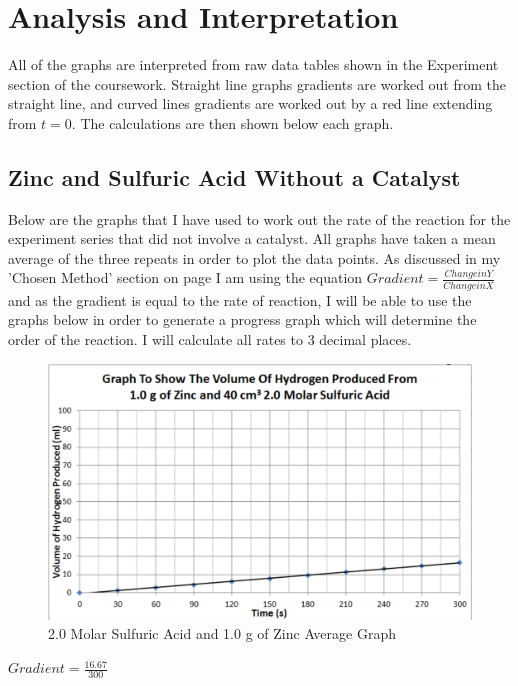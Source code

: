 \chapter {Analysis and Interpretation}

All of the graphs are interpreted from raw data tables shown in the Experiment section of the coursework. Straight line graphs gradients are worked out from the straight line, and curved lines gradients are worked out by a red line extending from $t = 0$. The calculations are then shown below each graph.

\section{Zinc and Sulfuric Acid Without a Catalyst}

Below are the graphs that I have used to work out the rate of the reaction for the experiment series that did not involve a catalyst. All graphs have taken a mean average of the three repeats in order to plot the data points. As discussed in my 'Chosen Method' section on page \pageref{Chosen Method} I am using the equation $Gradient = \frac{Change in Y}{Change in X}$ and as the gradient is equal to the rate of reaction, I will be able to use the graphs below in order to generate a progress graph which will determine the order of the reaction. I will calculate all rates to 3 decimal places.

\begin{figure}[H]
    \includegraphics[width=\textwidth]{./Analysis/Images/1NonCatalyst/2Molar.pdf}
    \caption{2.0 Molar Sulfuric Acid and 1.0 g of Zinc Average Graph} \label{fig:2MolarSAGradient}
\end{figure}

$Gradient = \frac{16.67}{300}$

